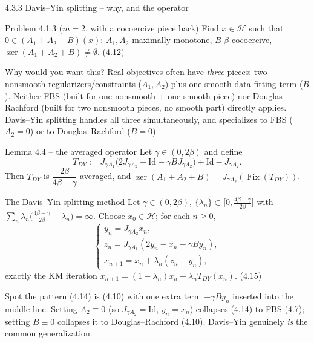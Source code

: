 \documentclass[aspectratio=169,10pt]{beamer}
\newcommand{\Id}{\mathrm{Id}}
\newcommand{\Fix}{\operatorname{Fix}}
\newcommand{\zer}{\operatorname{zer}}
\begin{document}
\begin{frame}[allowframebreaks]{4.3.3 Davis--Yin splitting -- why, and the operator}
  \begin{block}{Problem 4.1.3 ($m=2$, with a cocoercive piece back)}
    Find $x\in\mathcal H$ such that $0\in(A_1+A_2+B)(x)$: $A_1,A_2$ maximally monotone, $B$ $\beta$-cocoercive, $\zer(A_1+A_2+B)\ne\emptyset$. (4.12)
  \end{block}
  \begin{block}{Why would you want this?}
    Real objectives often have \emph{three} pieces: two nonsmooth regularizers/constraints ($A_1,A_2$) plus one smooth data-fitting term ($B$). Neither FBS (built for one nonsmooth $+$ one smooth piece) nor Douglas--Rachford (built for two nonsmooth pieces, no smooth part) directly applies. Davis--Yin splitting handles all three simultaneously, and specializes to FBS ($A_2=0$) or to Douglas--Rachford ($B=0$).
  \end{block}
  \begin{block}{Lemma 4.4 -- the averaged operator}
    Let $\gamma\in(0,2\beta)$ and define
    \begin{equation*}
      T_{DY} := J_{\gamma A_1}\big(2J_{\gamma A_2}-\Id-\gamma BJ_{\gamma A_2}\big) + \Id - J_{\gamma A_2}. \tag{4.13}
    \end{equation*}
    Then $T_{DY}$ is $\dfrac{2\beta}{4\beta-\gamma}$-averaged, and $\zer(A_1+A_2+B)=J_{\gamma A_2}(\Fix(T_{DY}))$.
  \end{block}

  \framebreak

  \begin{block}{The Davis--Yin splitting method}
    Let $\gamma\in(0,2\beta)$, $\{\lambda_n\}\subset\big[0,\tfrac{4\beta-\gamma}{2\beta}\big]$ with $\sum_n\lambda_n\big(\tfrac{4\beta-\gamma}{2\beta}-\lambda_n\big)=\infty$. Choose $x_0\in\mathcal H$; for each $n\ge0$,
    \begin{equation*}
      \begin{cases}
        y_n = J_{\gamma A_2}x_n, \\
        z_n = J_{\gamma A_1}(2y_n-x_n-\gamma B y_n), \\
        x_{n+1} = x_n+\lambda_n(z_n-y_n),
      \end{cases} \tag{4.14}
    \end{equation*}
    exactly the KM iteration $x_{n+1}=(1-\lambda_n)x_n+\lambda_n T_{DY}(x_n)$. (4.15)
  \end{block}
  \begin{block}{Spot the pattern}
    (4.14) is (4.10) with one extra term $-\gamma B y_n$ inserted into the middle line. Setting $A_2\equiv0$ (so $J_{\gamma A_2}=\Id$, $y_n=x_n$) collapses (4.14) to FBS (4.7); setting $B\equiv0$ collapses it to Douglas--Rachford (4.10). Davis--Yin genuinely \emph{is} the common generalization.
  \end{block}
\end{frame}
\end{document}
